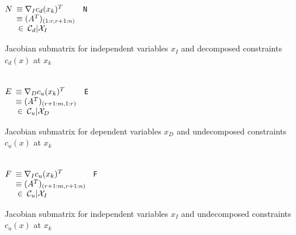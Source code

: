 {\begin{tabbing}
$N		\begin{array}[t]{l}
			\equiv \nabla_I c_d(x_k)^T \\
			\equiv (A^T)_{(1:r,r+1:n)} \\
			\:\in\: \mathcal{C}_d|\mathcal{X}_I
		\end{array}$
	\> \texttt{N}
		\> \parbox[t]{50ex}{
				Jacobian submatrix for independent variables $x_I$ and decomposed
				constraints $c_d(x)$ at $x_k$ } \\
$E		\begin{array}[t]{l}
			\equiv \nabla_D c_u(x_k)^T \\
			\equiv (A^T)_{(r+1:m,1:r)} \\
			\:\in\: \mathcal{C}_u|\mathcal{X}_D
		\end{array}$
	\> \texttt{E}
		\> \parbox[t]{50ex}{
				Jacobian submatrix for dependent variables $x_D$
				and undecomposed constraints $c_u(x)$ at $x_k$ } \\
$F		\begin{array}[t]{l}
			\equiv \nabla_I c_u(x_k)^T \\
			\equiv (A^T)_{(r+1:m,r+1:n)} \\
			\:\in\: \mathcal{C}_u|\mathcal{X}_I
		\end{array}$
	\> \texttt{F}
		\> \parbox[t]{50ex}{
				Jacobian submatrix for independent variables $x_I$
				and undecomposed constraints $c_u(x)$ at $x_k$ } \\
\end{tabbing}

\esinglespace}

